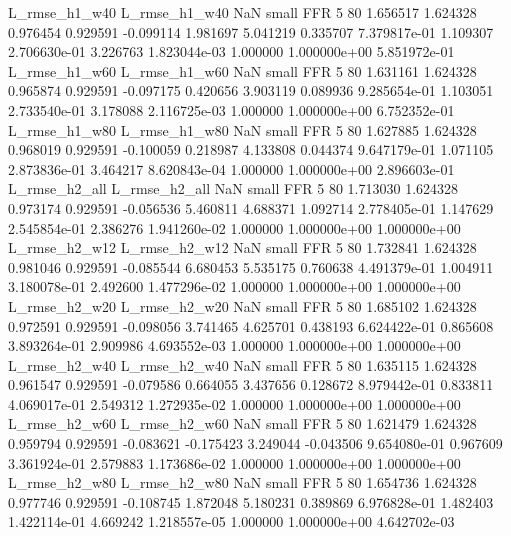  L_rmse_h1_w40  L_rmse_h1_w40                   NaN      small      FFR                 5 80 1.656517       1.624328 0.976454       0.929591   -0.099114      1.981697      5.041219     0.335707   7.379817e-01  1.109307 2.706630e-01     3.226763   1.823044e-03            1.000000    1.000000e+00        5.851972e-01
 L_rmse_h1_w60  L_rmse_h1_w60                   NaN      small      FFR                 5 80 1.631161       1.624328 0.965874       0.929591   -0.097175      0.420656      3.903119     0.089936   9.285654e-01  1.103051 2.733540e-01     3.178088   2.116725e-03            1.000000    1.000000e+00        6.752352e-01
 L_rmse_h1_w80  L_rmse_h1_w80                   NaN      small      FFR                 5 80 1.627885       1.624328 0.968019       0.929591   -0.100059      0.218987      4.133808     0.044374   9.647179e-01  1.071105 2.873836e-01     3.464217   8.620843e-04            1.000000    1.000000e+00        2.896603e-01
 L_rmse_h2_all  L_rmse_h2_all                   NaN      small      FFR                 5 80 1.713030       1.624328 0.973174       0.929591   -0.056536      5.460811      4.688371     1.092714   2.778405e-01  1.147629 2.545854e-01     2.386276   1.941260e-02            1.000000    1.000000e+00        1.000000e+00
 L_rmse_h2_w12  L_rmse_h2_w12                   NaN      small      FFR                 5 80 1.732841       1.624328 0.981046       0.929591   -0.085544      6.680453      5.535175     0.760638   4.491379e-01  1.004911 3.180078e-01     2.492600   1.477296e-02            1.000000    1.000000e+00        1.000000e+00
 L_rmse_h2_w20  L_rmse_h2_w20                   NaN      small      FFR                 5 80 1.685102       1.624328 0.972591       0.929591   -0.098056      3.741465      4.625701     0.438193   6.624422e-01  0.865608 3.893264e-01     2.909986   4.693552e-03            1.000000    1.000000e+00        1.000000e+00
 L_rmse_h2_w40  L_rmse_h2_w40                   NaN      small      FFR                 5 80 1.635115       1.624328 0.961547       0.929591   -0.079586      0.664055      3.437656     0.128672   8.979442e-01  0.833811 4.069017e-01     2.549312   1.272935e-02            1.000000    1.000000e+00        1.000000e+00
 L_rmse_h2_w60  L_rmse_h2_w60                   NaN      small      FFR                 5 80 1.621479       1.624328 0.959794       0.929591   -0.083621     -0.175423      3.249044    -0.043506   9.654080e-01  0.967609 3.361924e-01     2.579883   1.173686e-02            1.000000    1.000000e+00        1.000000e+00
 L_rmse_h2_w80  L_rmse_h2_w80                   NaN      small      FFR                 5 80 1.654736       1.624328 0.977746       0.929591   -0.108745      1.872048      5.180231     0.389869   6.976828e-01  1.482403 1.422114e-01     4.669242   1.218557e-05            1.000000    1.000000e+00        4.642702e-03
